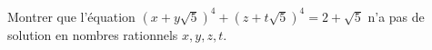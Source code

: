 Montrer que l'équation $(x + y\sqrt{5})^4 + (z + t\sqrt{5})^4 = 2 + \sqrt{5}$ n'a pas de solution en nombres rationnels $x, y, z, t$.

